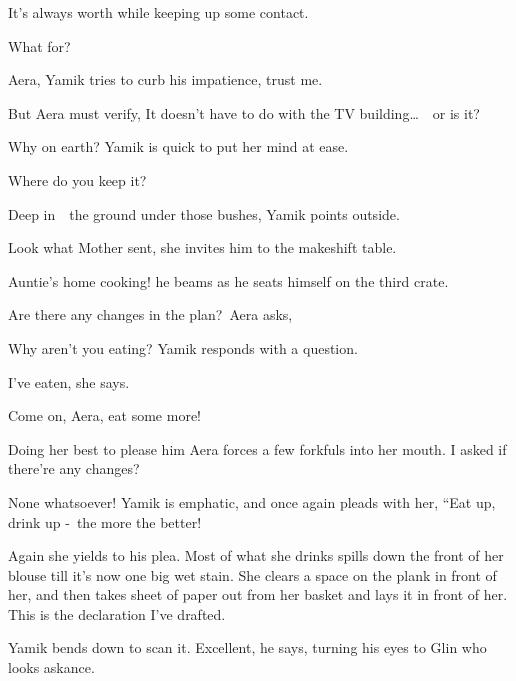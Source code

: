 \documentclass[twoside,11pt]{book}
\begin{document}
{\textquotedbl}It's always worth while keeping up some contact.{\textquotedbl} 

{\textquotedbl}What for?{\textquotedbl} 

{\textquotedbl}Aera,{\textquotedbl} Yamik tries to curb his impatience, {\textquotedbl}trust me.{\textquotedbl} 

But Aera must verify, {\textquotedbl}It doesn't have to do with the TV building{\dots}\ \ or is it?{\textquotedbl} 

{\textquotedbl}Why on earth?{\textquotedbl} Yamik is quick to put her mind at ease. ~

{\textquotedbl}Where do you keep it?{\textquotedbl} 

{\textquotedbl}Deep in\ \ the ground under those bushes,{\textquotedbl} Yamik points outside.

{\textquotedbl}Look what Mother sent,{\textquotedbl} she invites him to the makeshift table. 

{\textquotedbl}Auntie's home cooking!{\textquotedbl} he beams as he seats himself on the third crate. 

{\textquotedbl}Are there any changes in the plan?{\textquotedbl}~Aera asks,

{\textquotedbl}Why aren't you eating?{\textquotedbl} Yamik responds with a question. 

{\textquotedbl}I've eaten,{\textquotedbl} she says. ~

{\textquotedbl}Come on, Aera, eat some more!{\textquotedbl}\ \ 

Doing her best to please him Aera forces a few forkfuls into her mouth. {\textquotedbl}I asked if there're any
changes?{\textquotedbl}

{\textquotedbl}None whatsoever!{\textquotedbl} Yamik is emphatic, and once again pleads with her, ``Eat up, drink up
-{\ }the more the better!{\textquotedbl} 

Again she yields to his plea. Most of what she drinks spills down the front of her blouse till it's now one big wet
stain. She clears a space on the plank in front of her, and then takes sheet of paper out from her basket and lays it
in front of her. {\textquotedbl}This is the declaration I've drafted.{\textquotedbl}

Yamik bends down to scan it. {\textquotedbl}Excellent,{\textquotedbl} he says, turning his eyes to Glin who looks
askance.
\end{document}
